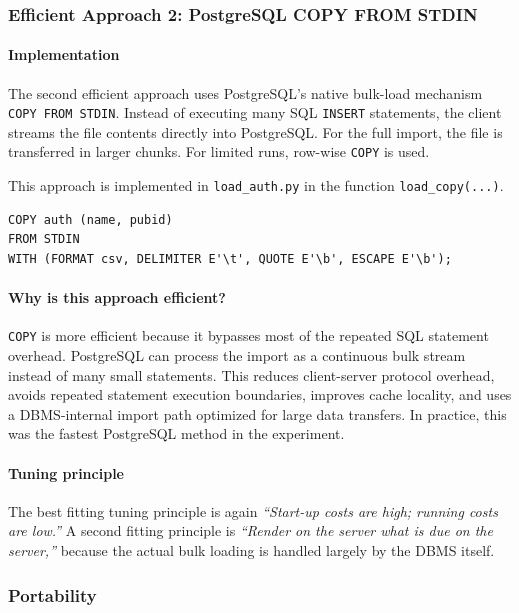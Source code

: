\documentclass[11pt]{scrartcl}
\begin{document}
\subsubsection*{Efficient Approach 2: PostgreSQL COPY FROM STDIN}

\paragraph{Implementation}

The second efficient approach uses PostgreSQL's native bulk-load mechanism \texttt{COPY FROM STDIN}. Instead of executing many SQL \texttt{INSERT} statements, the client streams the file contents directly into PostgreSQL. For the full import, the file is transferred in larger chunks. For limited runs, row-wise \texttt{COPY} is used.

This approach is implemented in \texttt{load\_auth.py} in the function \texttt{load\_copy(...)}.

\begin{lstlisting}[style=dbtsql]
COPY auth (name, pubid)
FROM STDIN
WITH (FORMAT csv, DELIMITER E'\t', QUOTE E'\b', ESCAPE E'\b');
\end{lstlisting}

\paragraph{Why is this approach efficient?}

\texttt{COPY} is more efficient because it bypasses most of the repeated SQL statement overhead. PostgreSQL can process the import as a continuous bulk stream instead of many small statements. This reduces client-server protocol overhead, avoids repeated statement execution boundaries, improves cache locality, and uses a DBMS-internal import path optimized for large data transfers. In practice, this was the fastest PostgreSQL method in the experiment.

\paragraph{Tuning principle}

The best fitting tuning principle is again \emph{``Start-up costs are high; running costs are low.''} A second fitting principle is \emph{``Render on the server what is due on the server,''} because the actual bulk loading is handled largely by the DBMS itself.

\subsubsection*{Portability}
\end{document}
